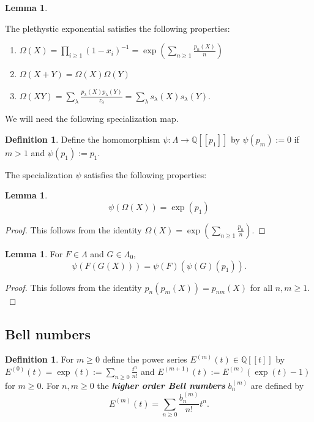 \documentclass[12pt,reqno]{amsart}
\theoremstyle{definition}
\newtheorem{lem}[thm]{Lemma}
\newtheorem{defn}[thm]{Definition}
\begin{document}
\begin{lem}\label{plethystic exp lem}
    
The plethystic exponential satisfies the following properties:
\begin{enumerate}
    \item $\Omega(X) = \prod_{i \geq 1} (1-x_i)^{-1} = \exp \left( \sum_{n \geq 1} \frac{p_n(X)}{n} \right)$
    \item $\Omega(X+Y) = \Omega(X)\Omega(Y)$
    \item $\Omega(XY) = \sum_{\lambda} \frac{p_{\lambda}(X)p_{\lambda}(Y)}{z_{\lambda}} = \sum_{\lambda}s_{\lambda}(X)s_{\lambda}(Y).$
\end{enumerate}
\end{lem}

We will need the following specialization map.

\begin{defn}
    Define the homomorphism $\psi: \Lambda \rightarrow \mathbb{Q}[[p_1]]$ by $\psi(p_m):= 0$ if $m > 1$ and $\psi(p_1):= p_1.$ 
\end{defn}

The specialization $\psi$ satisfies the following properties:

\begin{lem}\label{psi exp lem}
    $$\psi(\Omega(X)) = \exp(p_1)$$
\end{lem}
\begin{proof}
    This follows from the identity 
    $\Omega(X) = \exp\left( 
\sum_{n \geq 1} \frac{p_n}{n} \right).$
\end{proof}

\begin{lem}\label{psi comp lem}
For $F\in \Lambda$ and $G \in \Lambda_0$, 
    $$\psi( F(G(X)) ) =  \psi(F) ( \psi(G)(p_1)).$$
\end{lem}
\begin{proof}
    This follows from the identity $p_n(p_m(X)) = p_{nm}(X)$ for all $n,m \geq 1.$
\end{proof}



\subsection{Bell numbers}


\begin{defn}\cite{Bell}
    For $m \geq 0$ define the power series $E^{(m)}(t) \in \mathbb{Q}[[t]]$ by $E^{(0)}(t) = \exp(t) := \sum_{n \geq 0} \frac{t^n}{n!}$ and $E^{(m+1)}(t):= E^{(m)}(\exp(t)-1)$ for $m \geq 0.$ For $n,m \geq 0$ the \textit{\textbf{higher order Bell numbers}} $b_n^{(m)}$ are defined by 
    $$E^{(m)}(t) = \sum_{n \geq 0} \frac{b_n^{(m)}}{n!} t^n.$$
\end{defn}
\end{document}

